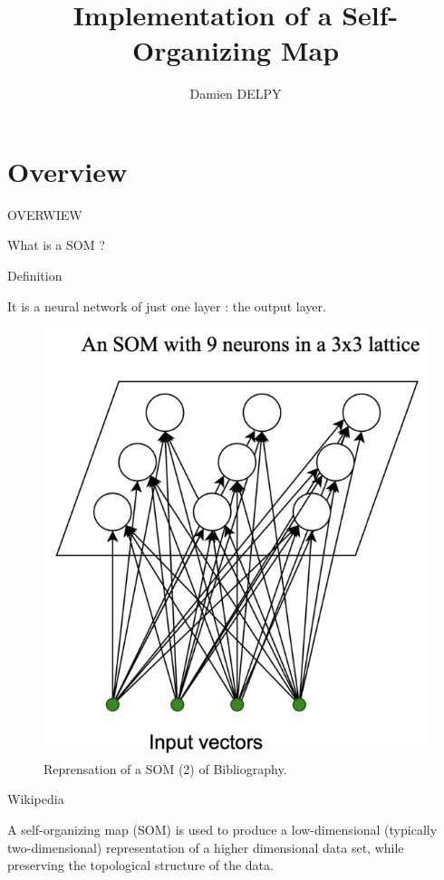 \documentclass{beamer}
\author{Damien DELPY}
\title{Implementation of a Self-Organizing Map}
\institute{ENSEIRB-MATMECA}
\begin{document}
\begin{frame}
	
	\titlepage
\end{frame}


\begin{frame}

	\tableofcontents[sectionstyle=show,subsectionstyle=show/shaded/hide,subsectionstyle=show/shaded/hide]
\end{frame}



\section{Overview}
	
	\begin{frame}

		\begin{center}
			
			\Huge OVERWIEW
		\end{center}
	\end{frame}


	\begin{frame}{What is a SOM ?}
		
		\begin{block}{Definition}
 
It is a neural network of just one layer : the output layer.
 	
			
		\begin{center}
			
			\begin{figure}[h]
			
				\includegraphics[width=0.3\linewidth]{pics/som_example_diapo_1.png}
				\caption{Reprensation of a SOM (2) of Bibliography.}
			\end{figure}
		\end{center}

		\end{block}		

		\begin{block}{Wikipedia}

A self-organizing map (SOM) is used to produce a low-dimensional (typically two-dimensional) representation of a higher dimensional data set, while preserving the topological structure of the data. 
		\end{block}
	\end{frame}
	
\end{document}
